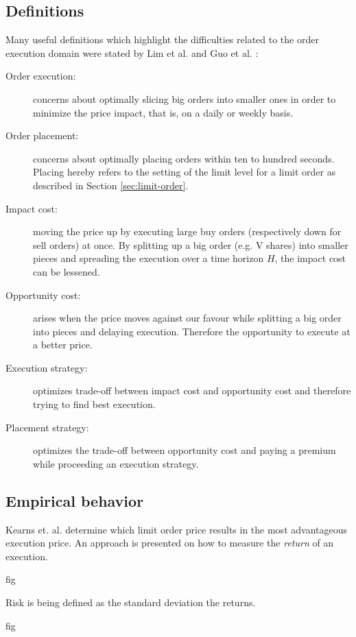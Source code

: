 \subsection{Definitions}

Many useful definitions which highlight the difficulties related to the order execution domain were stated by Lim et al. \cite{lim2005optimal} and Guo et al. \cite{guo2013optimal}:
\begin{description}
    \item[Order execution:] concerns about optimally slicing big orders into smaller ones in order to minimize the price impact, that is, on a daily or weekly basis.
    \item[Order placement: ] concerns about optimally placing orders within ten to hundred seconds.
    Placing hereby refers to the setting of the limit level for a limit order as described in Section \ref{sec:limit-order}.
    \item[Impact cost:] moving the price up by executing large buy orders (respectively down for sell orders) at once. 
    By splitting up a big order (e.g. V shares) into smaller pieces and spreading the execution over a time horizon $H$, the impact cost can be lessened.
    \item[Opportunity cost:] arises when the price moves against our favour while splitting a big order into pieces and delaying execution. 
    Therefore the opportunity to execute at a better price.
    \item[Execution strategy:] optimizes trade-off between impact cost and opportunity cost and therefore trying to find best execution.
    \item[Placement strategy:] optimizes the trade-off between opportunity cost and paying a premium while proceeding an execution strategy.
\end{description}

\subsection{Empirical behavior}

Kearns et. al. \cite{nevmyvaka2005electronic} determine which limit order price results in the most advantageous execution price.
An approach is presented on how to measure the \textit{return} of an execution.

fig 

Risk is being defined as the standard deviation the returns. 

fig

